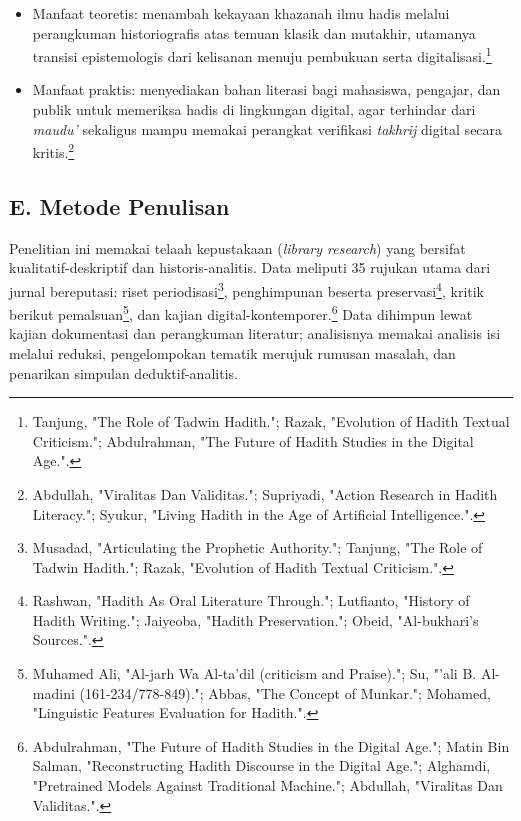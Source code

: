 \begin{itemize}[leftmargin=1.27cm,itemsep=2pt,parsep=2pt]
\item Manfaat teoretis: menambah kekayaan khazanah ilmu hadis melalui perangkuman historiografis atas temuan klasik dan mutakhir, utamanya transisi epistemologis dari kelisanan menuju pembukuan serta digitalisasi.\footnote{Tanjung, "The Role of Tadwin Hadith."; Razak, "Evolution of Hadith Textual Criticism."; Abdulrahman, "The Future of Hadith Studies in the Digital Age.".}

\item Manfaat praktis: menyediakan bahan literasi bagi mahasiswa, pengajar, dan publik untuk memeriksa hadis di lingkungan digital, agar terhindar dari \textit{maudu'} sekaligus mampu memakai perangkat verifikasi \textit{takhrij} digital secara kritis.\footnote{Abdullah, "Viralitas Dan Validitas."; Supriyadi, "Action Research in Hadith Literacy."; Syukur, "Living Hadith in the Age of Artificial Intelligence.".}

\end{itemize}
\subsection*{E. Metode Penulisan}

Penelitian ini memakai telaah kepustakaan (\textit{library research}) yang bersifat kualitatif-deskriptif dan historis-analitis. Data meliputi 35 rujukan utama dari jurnal bereputasi: riset periodisasi\footnote{Musadad, "Articulating the Prophetic Authority."; Tanjung, "The Role of Tadwin Hadith."; Razak, "Evolution of Hadith Textual Criticism.".}, penghimpunan beserta preservasi\footnote{Rashwan, "Hadith As Oral Literature Through."; Lutfianto, "History of Hadith Writing."; Jaiyeoba, "Hadith Preservation."; Obeid, "Al-bukhari's Sources.".}, kritik berikut pemalsuan\footnote{Muhamed Ali, "Al-jarh Wa Al-ta'dil (criticism and Praise)."; Su, "'ali B. Al-madini (161-234/778-849)."; Abbas, "The Concept of Munkar."; Mohamed, "Linguistic Features Evaluation for Hadith.".}, dan kajian digital-kontemporer.\footnote{Abdulrahman, "The Future of Hadith Studies in the Digital Age."; Matin Bin Salman, "Reconstructing Hadith Discourse in the Digital Age."; Alghamdi, "Pretrained Models Against Traditional Machine."; Abdullah, "Viralitas Dan Validitas.".} Data dihimpun lewat kajian dokumentasi dan perangkuman literatur; analisisnya memakai analisis isi melalui reduksi, pengelompokan tematik merujuk rumusan masalah, dan penarikan simpulan deduktif-analitis.

